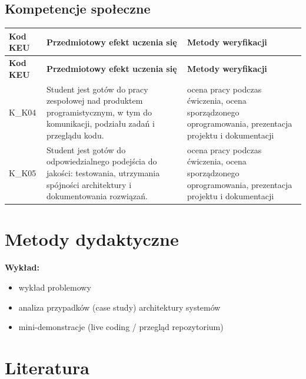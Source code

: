 \documentclass[12pt, a4paper]{article}
\newcommand{\thdrule}{\noalign{\global\setlength{\extrarowheight}{0pt}}}
\newcommand{\thdend}{\noalign{\global\setlength{\extrarowheight}{3pt}}}
\begin{document}
\subsection*{Kompetencje społeczne}
{\scriptsize
\begin{longtable}{m{1.6cm}m{9.0cm}m{4.2cm}}
\thdrule\toprule
\rowcolor{pjatkRed} {\color{white}\footnotesize\textbf{\vphantom{Ag}Kod KEU}} & {\color{white}\footnotesize\textbf{\vphantom{Ag}Przedmiotowy efekt uczenia się}} & {\color{white}\footnotesize\textbf{\vphantom{Ag}Metody weryfikacji}} \\
\midrule\thdend
\endfirsthead
\thdrule\toprule
\rowcolor{pjatkRed} {\color{white}\footnotesize\textbf{\vphantom{Ag}Kod KEU}} & {\color{white}\footnotesize\textbf{\vphantom{Ag}Przedmiotowy efekt uczenia się}} & {\color{white}\footnotesize\textbf{\vphantom{Ag}Metody weryfikacji}} \\
\midrule\thdend
\endhead
  \rowcolor{tableRowLight} K\_K04 & Student jest gotów do pracy zespołowej nad produktem programistycznym, w tym do komunikacji, podziału zadań i przeglądu kodu. & ocena pracy podczas ćwiczenia, ocena sporządzonego oprogramowania, prezentacja projektu i dokumentacji \\
  \rowcolor{tableRowAlt} K\_K05 & Student jest gotów do odpowiedzialnego podejścia do jakości: testowania, utrzymania spójności architektury i dokumentowania rozwiązań. & ocena pracy podczas ćwiczenia, ocena sporządzonego oprogramowania, prezentacja projektu i dokumentacji \\
\bottomrule
\end{longtable}}

\section{Metody dydaktyczne}

\textbf{Wykład:}
\begin{itemize}
  \item wykład problemowy
  \item analiza przypadków (case study) architektury systemów
  \item mini-demonstracje (live coding / przegląd repozytorium)
\end{itemize}
\vspace{4pt}


\section{Literatura}
\end{document}
